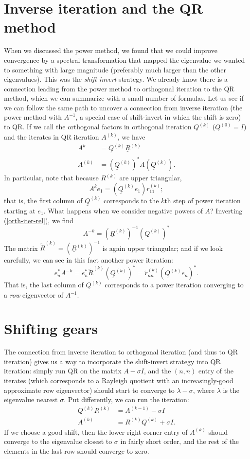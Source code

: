 \documentclass[12pt, leqno]{article} %
\newcommand{\uQ}{\underline{Q}}
\newcommand{\uR}{\underline{R}}
\begin{document}

\section{Inverse iteration and the QR method}

When we discussed the power method, we found that we could improve
convergence by a spectral transformation that mapped the eigenvalue we
wanted to something with large magnitude (preferably much larger than
the other eigenvalues).  This was the {\em shift-invert} strategy.
We already know there is a connection leading from the power method
to orthogonal iteration to the QR method, which we can summarize with
a small number of formulas.  Let us see if we can follow the same
path to uncover a connection from inverse iteration (the power method
with $A^{-1}$, a special case of shift-invert in which the shift is zero) to QR.
If we call the orthogonal factors
in orthogonal iteration  $\uQ^{(k)}$ ($\uQ^{(0)} = I$) and the iterates
in QR iteration $A^{(k)}$, we have
\begin{align}
  A^{k}   &= \uQ^{(k)} \uR^{(k)} \label{orth-iter-rel} \\
  A^{(k)} &= (\uQ^{(k)})^* A (\uQ^{(k)}).
\end{align}
In particular, note that because $R^{(k)}$ are upper triangular,
\[
  A^{k} e_1 = (\uQ^{(k)} e_1) r^{(k)}_{11};
\]
that is, the first column of $\uQ^{(k)}$ corresponds to the $k$th
step of power iteration starting at $e_1$.  What happens when we
consider negative powers of $A$?  Inverting (\ref{orth-iter-rel}),
we find
\[
  A^{-k} = (\uR^{(k)})^{-1} (\uQ^{(k)})^*
\]
The matrix $\tilde{R}^{(k)} = (\uR^{(k)})^{-1}$ is again upper triangular;
and if we look carefully, we can see in this fact another power iteration:
\[
  e_n^* A^{-k} = e_n^* \tilde{R}^{(k)} (\uQ^{(k)})^*
              = \tilde{r}^{(k)}_{nn} (\uQ^{(k)} e_n)^*.
\]
That is, the last column of $\uQ^{(k)}$ corresponds to a power iteration
converging to a {\em row} eigenvector of $A^{-1}$.

\section{Shifting gears}

The connection from inverse iteration to orthogonal iteration (and
thus to QR iteration) gives us a way to incorporate the shift-invert
strategy into QR iteration: simply run QR on the matrix $A-\sigma I$,
and the $(n,n)$ entry of the iterates (which corresponds to a Rayleigh
quotient with an increasingly-good approximate row eigenvector) should
start to converge to $\lambda - \sigma$, where $\lambda$ is the
eigenvalue nearest $\sigma$.  Put differently, we can run the
iteration:
\begin{align*}
  Q^{(k)} R^{(k)} &= A^{(k-1)} - \sigma I \\
  A^{(k)} &= R^{(k)} Q^{(k)} + \sigma I.
\end{align*}
If we choose a good shift, then the lower right corner entry of
$A^{(k)}$ should converge to the eigenvalue closest to $\sigma$ in
fairly short order, and the rest of the elements in the last row
should converge to zero.
\end{document}
